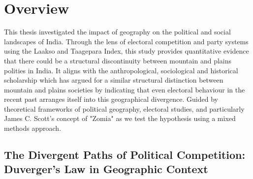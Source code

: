 \section{Overview}
This thesis investigated the impact of geography on the political and social landscapes of India. Through the lens of electoral competition and party systems using the Laakso and Taagepara Index, this study provides quantitative evidence that there could be a structural discontinuity between mountain and plains polities in India. It aligns with the anthropological, sociological and historical scholarship which has argued for a similar structural distinction between mountain and plains societies by indicating that even electoral behaviour in the recent past arranges itself into this geographical divergence. Guided by  theoretical frameworks of political geography, electoral studies, and particularly James C. Scott's concept of "Zomia" as we test the hypothesis using a mixed methods approach.

\subsection{The Divergent Paths of Political Competition: Duverger's Law in Geographic Context}

